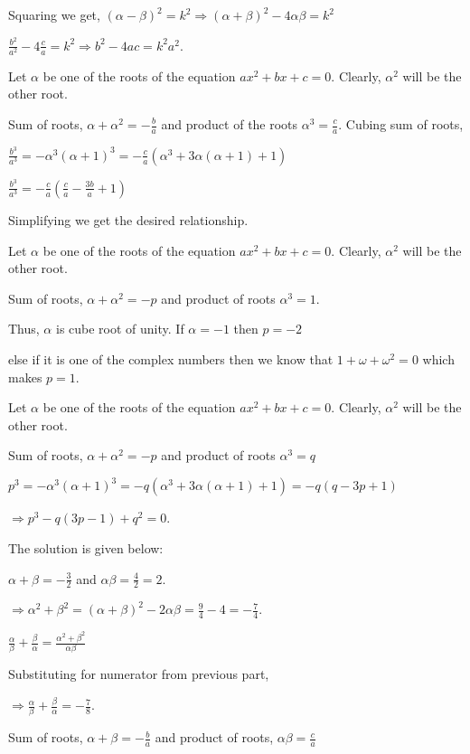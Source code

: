   Squaring we get, $(\alpha - \beta)^2 = k^2 \Rightarrow (\alpha + \beta)^2 - 4\alpha\beta = k^2$

  $\frac{b^2}{a^2} - 4\frac{c}{a} = k^2 \Rightarrow b^2 - 4ac = k^2a^2$.
\item Let $\alpha$ be one of the roots of the equation $ax^2 + bx + c = 0$. Clearly, $\alpha^2$ will be the other root.

  Sum of roots, $\alpha + \alpha^2 = -\frac{b}{a}$ and product of the roots $\alpha^3 = \frac{c}{a}$. Cubing sum of roots,

  $\frac{b^3}{a^3} = -\alpha^3(\alpha + 1)^3 = -\frac{c}{a}(\alpha^3 + 3\alpha(\alpha + 1) + 1)$

  $\frac{b^3}{a^3} = -\frac{c}{a}\left(\frac{c}{a} - \frac{3b}{a} + 1\right)$

  Simplifying we get the desired relationship.
\item Let $\alpha$ be one of the roots of the equation $ax^2 + bx + c = 0$. Clearly, $\alpha^2$ will be the other root.

  Sum of roots, $\alpha + \alpha^2 = -p$ and product of roots $\alpha^3 = 1$.

  Thus, $\alpha$ is cube root of unity. If $\alpha = -1$ then $p = -2$

  else if it is one of the complex numbers then we know that $1 + \omega + \omega^2 = 0$ which makes $p =
  1$.
\item Let $\alpha$ be one of the roots of the equation $ax^2 + bx + c = 0$. Clearly, $\alpha^2$ will be the other root.

  Sum of roots, $\alpha + \alpha^2 = -p$ and product of roots $\alpha^3 = q$

  $p^3 = -\alpha^3(\alpha + 1)^3 = -q(\alpha^3 + 3\alpha(\alpha + 1) + 1) = -q(q - 3p + 1)$

  $\Rightarrow p^3 - q(3p - 1) + q^2 = 0$.
\item The solution is given below:
  \startitemize[i]
  \item $\alpha + \beta = -\frac{3}{2}$ and $\alpha\beta = \frac{4}{2} = 2$.

    $\Rightarrow \alpha^2 + \beta^2 = (\alpha + \beta)^2 - 2\alpha\beta = \frac{9}{4} - 4 = -\frac{7}{4}$.
  \item $\frac{\alpha}{\beta} + \frac{\beta}{\alpha} = \frac{\alpha^2 + \beta^2}{\alpha\beta}$

    Substituting for numerator from previous part,

    $\Rightarrow \frac{\alpha}{\beta} + \frac{\beta}{\alpha} = -\frac{7}{8}$.
  \stopitemize
\item Sum of roots, $\alpha + \beta = -\frac{b}{a}$ and product of roots, $\alpha\beta = \frac{c}{a}$

